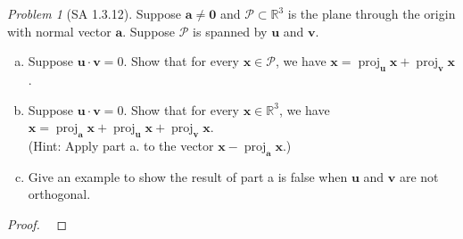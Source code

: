 \documentclass[fleqn,11pt]{paper}
\theoremstyle{remark}
\newtheorem{problem}{Problem}
\newcommand\R{\fld{R}}
\newcommand\proj{\ensuremath{\operatorname{proj}}}
\renewcommand{\vec}[1]{\mathbf{#1}}
\newcommand{\<}{\ensuremath{\langle}}
\renewcommand{\>}{\ensuremath{\rangle}}
\newcommand\fld[1]{\ensuremath{\mathbb{#1}}}
\newcommand\va{\vec{a}}
\newcommand\vu{\vec{u}}
\newcommand\vv{\vec{v}}
\newcommand\vx{\vec{x}}
\newcommand\vzero{\vec{0}}
\newcommand\sP{\ensuremath{\mathscr P}}
\begin{document}
\begin{problem}[SA 1.3.12]
Suppose $\va \neq \vzero$ and $\sP \subset \R^3$ is the plane through the origin
with normal vector $\va$. 
Suppose $\sP$ is spanned by $\vu$ and $\vv$.
\begin{enumerate}[a.]
\item 
Suppose $\vu \cdot \vv = 0$. Show that for every $\vx \in \sP$, we have
$\vx = \proj_\vu \vx + \proj_\vv \vx$.
\item
Suppose $\vu \cdot \vv = 0$. Show that for every $\vx \in \R^3$, we have
$\vx = \proj_\va \vx + \proj_\vu \vx + \proj_\vv \vx$.\\
(Hint: Apply part a. to the vector $\vx - \proj_\va \vx$.)
\item
Give an example to show the result of part a is false when $\vu$ and $\vv$ are
not orthogonal. 
\end{enumerate}
\end{problem}
\begin{proof}
~\vfill
\end{proof}

\end{document}

